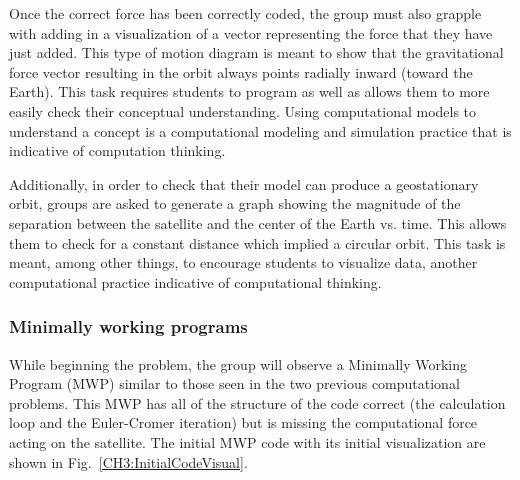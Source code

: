 \documentclass{msuphddissertation}
\begin{document}
\begin{doublespace}
Once the correct force has been correctly coded, the group must also grapple with adding in a visualization of a vector representing the force that they have just added.  This type of motion diagram is meant to show that the gravitational force vector resulting in the orbit always points radially inward (toward the Earth).  This task requires students to program as well as allows them to more easily check their conceptual understanding.  Using computational models to understand a concept is a computational modeling and simulation practice that is indicative of computation thinking.

Additionally, in order to check that their model can produce a geostationary orbit, groups are asked to generate a graph showing the magnitude of the separation between the satellite and the center of the Earth vs. time.  This allows them to check for a constant distance which implied a circular orbit.  This task is meant, among other things, to encourage students to visualize data, another computational practice indicative of computational thinking.

\subsubsection{Minimally working programs}

While beginning the problem, the group will observe a Minimally Working Program (MWP) similar to those seen in the two previous computational problems.  This MWP has all of the structure of the code correct (the calculation loop and the Euler-Cromer iteration) but is missing the computational force acting on the satellite.  The initial MWP code with its initial visualization are shown in Fig.~\ref{CH3:InitialCodeVisual}.


\end{doublespace}
\end{document}
